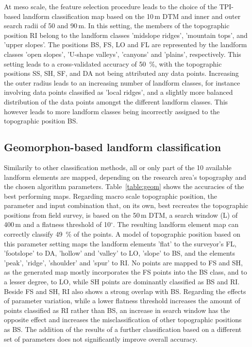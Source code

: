 \documentclass[preprint,12pt,authoryear]{elsarticle}
\begin{document}
At meso scale, the feature selection procedure leads to the choice of the TPI-based landform classification map based on the 10\,m DTM and inner and outer search radii of 50 and 90\,m. In this setting, the members of the topographic position RI belong to the landform classes 'midslope ridges', 'mountain tops', and 'upper slopes'. The positions BS, FS, LO and FL are represented by the landform classes 'open slopes', 'U-shape valleys', 'canyons' and 'plains', respectively. This setting leads to a cross-validated accuracy of 50~\%, with the topographic positions SS, SH, SF, and DA not being attributed any data points. Increasing the outer radius leads to an increasing number of landform classes, for instance involving data points classified as 'local ridges', and a slightly more balanced distribution of the data points amongst the different landform classes. This however leads to more landform classes being incorrectly assigned to the topographic position BS. 

\subsection{Geomorphon-based landform classification}
Similarily to other classification methods, all or only part of the 10 available landform elements are mapped, depending on the research area's topography and the chosen algorithm parameters. Table~\ref{table:geom} shows the accuracies of the best performing maps.
Regarding macro scale topographic position, the parameter and input combination that, on its own, best recreates the topographic positions from field survey, is based on the 50\,m DTM, a search window (L) of 400\,m and a flatness threshold of 10$^{\circ}$. The resulting landform element map can correctly classify 49~\% of the points. A model of topographic position based on this parameter setting maps the landform elements 'flat' to the surveyor's FL, 'footslope' to DA,  'hollow' and 'valley' to LO, 'slope' to BS, and the elements 'peak', 'ridge', 'shoulder' and 'spur' to RI. No points are mapped to FS and SH, as the generated map mostly incorporates the FS points into the BS class, and to a lesser degree, to LO, while SH points are dominantly classified as BS and RI. Beside FS  and SH, RI also shows a strong overlap with BS. Regarding the effects of parameter variation, while a lower flatness threshold increases the amount of points classified as RI rather than BS, an increase in search window has the opposite effect and increases the misclassification of other topographic positions as BS. The addition of the results of a further classification based on a different set of parameters does not significantly improve overall accuracy.
\end{document}
